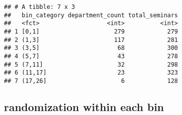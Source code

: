 \documentclass[
]{article}
\begin{document}
\begin{verbatim}
## # A tibble: 7 x 3
##   bin_category department_count total_seminars
##   <fct>                   <int>          <int>
## 1 [0,1]                     279            279
## 2 (1,3]                     117            281
## 3 (3,5]                      68            300
## 4 (5,7]                      43            278
## 5 (7,11]                     32            298
## 6 (11,17]                    23            323
## 7 (17,26]                     6            128
\end{verbatim}

\newpage

\subsection{randomization within each
bin}\label{randomization-within-each-bin}
\end{document}
